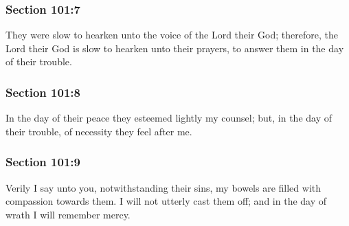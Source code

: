 	\subsubsection{Section 101:7} %
		\label{DC101-7}

		They were slow to hearken unto the voice of the Lord their God; therefore, the Lord their God is slow to hearken unto their prayers, to answer them in the day of their trouble.


	\subsubsection{Section 101:8} %
		\label{DC101-8}

		In the day of their peace they esteemed lightly my counsel; but, in the day of their trouble, of necessity they feel after me.


	\subsubsection{Section 101:9} %
		\label{DC101-9}

		Verily I say unto you, notwithstanding their sins, my bowels are filled with compassion towards them.  I will not utterly cast them off; and in the day of wrath I will remember mercy.



